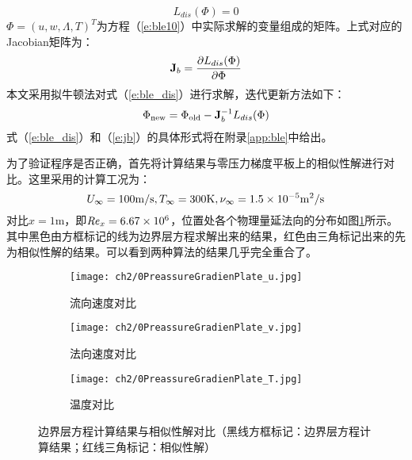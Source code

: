 \begin{equation}\label{e:ble_dis}
  L_{dis}(\Phi)=0
\end{equation}
$\Phi=(u,w,\Lambda,T)^T$为方程（\ref{e:ble10}）中实际求解的变量组成的矩阵。上式对应的Jacobian矩阵为：
\begin{equation}\label{e:jb}
  \mathbf{J}_b = \frac{\partial L_{dis}(\Phi)}{\partial \Phi}
\end{equation}
本文采用拟牛顿法对式（\ref{e:ble_dis}）进行求解，迭代更新方法如下：
\begin{equation}\label{e:ble_iter}
  \Phi_{\rm new} = \Phi_{\rm old} - \mathbf{J}_b^{-1}L_{dis}(\Phi)
\end{equation}
式（\ref{e:ble_dis}）和（\ref{e:jb}）的具体形式将在附录\ref{app:ble}中给出。

为了验证程序是否正确，首先将计算结果与零压力梯度平板上的相似性解进行对比。这里采用的计算工况为：
\begin{equation}\label{}
  U_\infty  = 100{\rm m/s},T_\infty  = 300{\rm K},\nu_\infty  = 1.5 \times 10^{ - 5} {\rm m^2 /s}
\end{equation}
对比$x=1$m，即$\mbox{{\textit{Re}}}_x=6.67\times10^6$，位置处各个物理量延法向的分布如图\ref{f:0PreassureGradienPlate}所示。其中黑色由方框标记的线为边界层方程求解出来的结果，红色由三角标记出来的先为相似性解的结果。可以看到两种算法的结果几乎完全重合了。
\begin{figure}[h]
  \centering%

  \begin{subfigure}{0.5\textwidth}
    \texttt{[image: ch2/0PreassureGradienPlate\_u.jpg]}
    \caption{流向速度对比}
  \end{subfigure}%
  \begin{subfigure}{0.5\textwidth}
    \texttt{[image: ch2/0PreassureGradienPlate\_v.jpg]}
    \caption{法向速度对比}
  \end{subfigure}%
  \bigskip

  \begin{subfigure}{0.5\textwidth}
    \texttt{[image: ch2/0PreassureGradienPlate\_T.jpg]}
    \caption{温度对比}
  \end{subfigure}%
  \caption{边界层方程计算结果与相似性解对比（黑线方框标记：边界层方程计算结果；红线三角标记：相似性解）}
  \label{f:0PreassureGradienPlate}
\end{figure}

